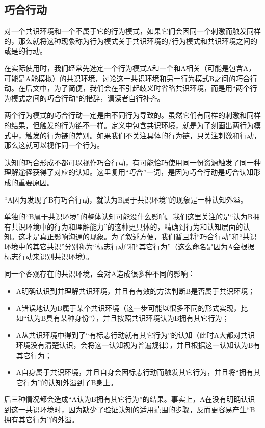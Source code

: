 \subsection{巧合行动}
对一个共识环境和一个不属于它的行为模式，如果它们会因同一个刺激而触发同样的，那么就将这种现象称为行为模式关于共识环境的/行为模式和共识环境之间的或是的行动。
\begin{explain}
在实际使用时，我们经常先选定一个行为模式A和一个和A相关（可能是包含A，可能是A能模拟）的共识环境，讨论这一共识环境和另一行为模式B之间的巧合行动。在后文中，为了简便，我们会在不引起歧义时省略共识环境，而是用“两个行为模式之间的巧合行动”的措辞，请读者自行补齐。

两个行为模式的巧合行动一定是由不同行为导致的。虽然它们有同样的刺激和同样的结果，但触发的行为链不一样。定义中包含共识环境，就是为了刻画出两行为模式中，触发的行为链的差别。如果我们不关注具体的行为链，只关注刺激和行动，那么这就可以视作同一个行为。

认知的巧合形成不都可以视作巧合行动，有可能恰巧使用同一份资源触发了同一种理解途径获得了对应的认知。这里复用“巧合”一词，是因为巧合行动是巧合认知形成的重要原因。
\end{explain}
“A因为发现了B有巧合行动，就认为B属于共识环境”的现象是一种认知外溢。
\begin{explain}
单独的“B属于共识环境”的整体认知可能没什么影响。我们这里关注的是“认为B拥有共识环境中的行为和理解能力”的这种更具体的，精确到行为和认知层面的认知。这才是真正影响沟通的现象。为了叙述方便，我们暂且将“巧合行动”和“共识环境中的其它共识”分别称为“标志行动”和“其它行为”（这么命名是因为A会根据标志行动来识别共识环境）。

同一个客观存在的共识环境，会对A造成很多种不同的影响：
\begin{itemize}
\item A明确认识到并理解共识环境，并且有有效的方法判断B是否属于共识环境；
\item A错误地认为B属于某个共识环境（这一步可能以很多不同的形式实现，比如“认为B具有某种身份”），并且按照共识环境认为B拥有其它行为；
\item A从共识环境中得到了“有标志行动就有其它行为”的认知（此时A大都对共识环境没有清楚认识，会将这一认知视为普遍规律），并且根据这一认知认为B有其它行为；
\item A自身属于共识环境，并且自身会因标志行动而触发其它行为，并且将“拥有其它行为”的认知外溢到了B身上。
\end{itemize}
后三种情况都会造成“A认为B拥有其它行为”的结果。事实上，A在没有明确认识到这一共识环境时，因为缺少了验证认知的适用范围的步骤，反而更容易产生“B拥有其它行为”的外溢。
\end{explain}
